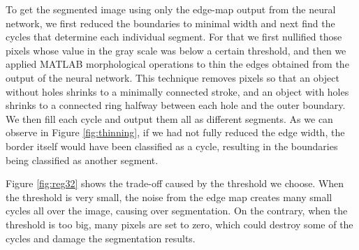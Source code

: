 \documentclass[10pt, twocolumn, twoside]{article}
\begin{document}
To get the segmented image using only the edge-map output from the neural network, we first reduced the boundaries to minimal width and next find the cycles that determine each individual segment. For that we first nullified those pixels whose value in the gray scale was below a certain threshold, and then we applied MATLAB morphological operations to thin the edges obtained from the output of the neural network. This technique removes pixels so that an object without holes shrinks to a minimally connected stroke, and an object with holes shrinks to a connected ring halfway between each hole and the outer boundary. We then fill each cycle and output them all as different segments. As we can observe in Figure \ref{fig:thinning}, if we had not fully reduced the edge width, the border itself would have been classified as a cycle, resulting in the boundaries being classified as another segment.

Figure \ref{fig:reg32} shows the trade-off caused by the threshold we choose. When the threshold is very small, the noise from the edge map creates many small cycles all over the image, causing over segmentation. On the contrary, when the threshold is too big, many pixels are set to zero, which could destroy some of the cycles and damage the segmentation results.
\end{document}
